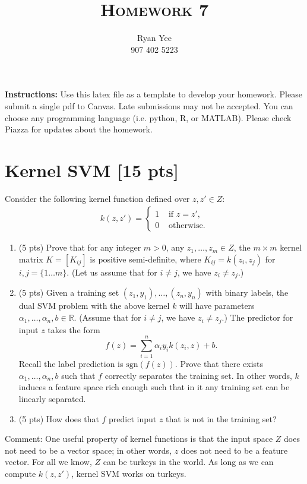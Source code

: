 \documentclass[a4paper]{article}
\title{\textsc{Homework 7}} %
\author{
    Ryan Yee \\
	907 402 5223 \\
}
\date{}
\theoremstyle{definition}
\newcommand{\sgn}{\mathrm{sgn}}
\def\R{\mathbb R}
\begin{document}
\maketitle 

\textbf{Instructions:}
Use this latex file as a template to develop your homework. Please submit a single pdf to Canvas. Late submissions may not be accepted. You can choose any programming language (i.e. python, R, or MATLAB). Please check Piazza for updates about the homework.
\vspace{0.1in}

\section{Kernel SVM [15 pts]}
Consider the following kernel function defined over $z,z'\in Z$:
\begin{align*}
k(z,z') =
\begin{cases}
1 & \text{~if~} z=z', \\
0 & \text{~otherwise.}
\end{cases}
\end{align*}
\begin{enumerate}
\item (5 pts) Prove that for any integer $m>0$, any $z_1, \ldots, z_m \in Z$, the $m \times m$ kernel matrix $K=[K_{ij}]$ is positive semi-definite, where $K_{ij}=k(z_i, z_j)$ for $i,j=\{1\ldots m\}$. (Let us assume that for $i \neq j$, we have $z_i \neq z_j$.)

\item (5 pts) Given a training set $(z_1, y_1), \ldots, (z_n, y_n)$ with binary labels, the dual SVM problem with the above kernel $k$ will have parameters $\alpha_1, \ldots, \alpha_n, b \in \R$.  (Assume that for $i \neq j$, we have $z_i \neq z_j$.) The predictor for input $z$ takes the form
$$f(z) = \sum_{i=1}^n \alpha_i y_i k(z_i, z) + b.$$
Recall the label prediction is $\sgn(f(z))$.
Prove that there exists $\alpha_1, \ldots, \alpha_n, b$ such that $f$ correctly separates the training set.
In other words, $k$ induces a feature space rich enough such that in it any training set can be linearly separated.

\item (5 pts) How does that $f$ predict input $z$ that is not in the training set?

\end{enumerate}

Comment: One useful property of kernel functions is that the input space $Z$ does not need to be a vector space; in other words, $z$ does not need to be a feature vector.  For all we know, $Z$ can be turkeys in the world.  As long as we can compute $k(z,z')$, kernel SVM works on turkeys.
\end{document}
